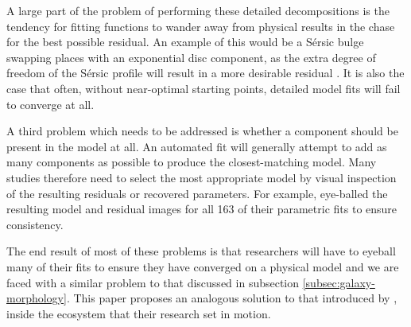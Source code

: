 \documentclass[../main.tex]{subfiles}
\begin{document}
A large part of the problem of performing these detailed decompositions is the tendency for fitting functions to wander away from physical results in the chase for the best possible residual. An example of this would be a S\'ersic bulge swapping places with an exponential disc component, as the extra degree of freedom of the S\'ersic profile will result in a more desirable residual \citep{Kruk2017:1705.00007v1}. It is also the case that often, without near-optimal starting points, detailed model fits will fail to converge at all.

A third problem which needs to be addressed is whether a component should be present in the model at all. An automated fit will generally attempt to add as many components as possible to produce the closest-matching model. Many studies therefore need to select the most appropriate model by visual inspection of the resulting residuals or recovered parameters. For example, \citet{Vika2014:1408.4070v1} eye-balled the resulting model and residual images for all 163 of their parametric fits to ensure consistency.

The end result of most of these problems is that researchers will have to eyeball many of their fits to ensure they have converged on a physical model and we are faced with a similar problem to that discussed in subsection \ref{subsec:galaxy-morphology}. This paper proposes an analogous solution to that introduced by \cite{Lintott2008:0804.4483v1}, inside the ecosystem that their research set in motion.
\end{document}
